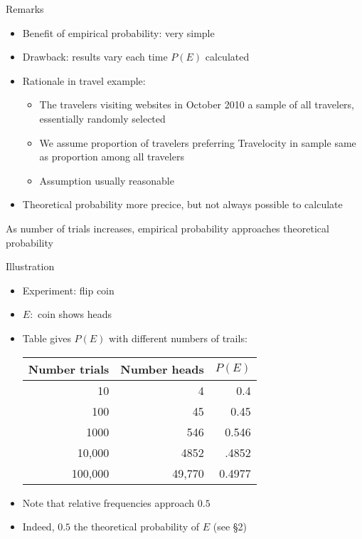 \documentclass{beamer}
\theoremstyle{definition}
\begin{document}
\begin{frame}{Remarks}
\begin{itemize}
\item Benefit of empirical probability: very simple
\item Drawback: results vary each time $P\left(E\right)$ calculated
\item Rationale in travel example:
\begin{itemize}
\item The travelers visiting websites in October 2010 a \alert{sample}
of all travelers, essentially \alert{randomly} selected
\item We assume proportion of travelers preferring Travelocity
in sample same as proportion among all travelers
\item Assumption usually reasonable
\end{itemize}
\item Theoretical probability more precice,
but not always possible to calculate
\end{itemize}
\begin{theorem}
As number of trials increases, empirical probability
approaches theoretical probability
\end{theorem}
\end{frame}

\begin{frame}{Illustration}
\begin{itemize}
\item Experiment: flip coin
\item $E:$ coin shows heads
\item Table gives $P\left(E\right)$ with different numbers of trails:
\begin{center}\begin{tabular}{rrr}
Number trials&Number heads&$P\left(E\right)$\\\hline
10&4&0.4\\
100&45&0.45\\
1000&546&0.546\\
10,000&4852&.4852\\
100,000&49,770&0.4977
\end{tabular}\end{center}
\item Note that relative frequencies approach $0.5$
\item Indeed, $0.5$ the theoretical probability of $E$
(see \S2)
\end{itemize}
\end{frame}
\end{document}
